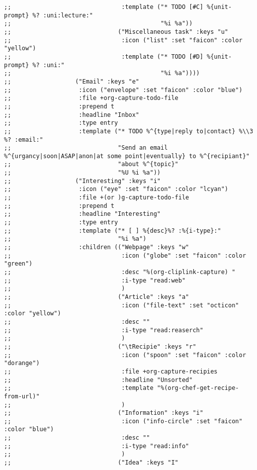 \documentclass[11pt]{article}
\begin{document}
\begin{verbatim}
;;                               :template ("* TODO [#C] %{unit-prompt} %? :uni:lecture:"
;;                                          "%i %a"))
;;                              ("Miscellaneous task" :keys "u"
;;                               :icon ("list" :set "faicon" :color "yellow")
;;                               :template ("* TODO [#D] %{unit-prompt} %? :uni:"
;;                                          "%i %a"))))
;;                  ("Email" :keys "e"
;;                   :icon ("envelope" :set "faicon" :color "blue")
;;                   :file +org-capture-todo-file
;;                   :prepend t
;;                   :headline "Inbox"
;;                   :type entry
;;                   :template ("* TODO %^{type|reply to|contact} %\\3 %? :email:"
;;                              "Send an email %^{urgancy|soon|ASAP|anon|at some point|eventually} to %^{recipiant}"
;;                              "about %^{topic}"
;;                              "%U %i %a"))
;;                  ("Interesting" :keys "i"
;;                   :icon ("eye" :set "faicon" :color "lcyan")
;;                   :file +(or )g-capture-todo-file
;;                   :prepend t
;;                   :headline "Interesting"
;;                   :type entry
;;                   :template ("* [ ] %{desc}%? :%{i-type}:"
;;                              "%i %a")
;;                   :children (("Webpage" :keys "w"
;;                               :icon ("globe" :set "faicon" :color "green")
;;                               :desc "%(org-cliplink-capture) "
;;                               :i-type "read:web"
;;                               )
;;                              ("Article" :keys "a"
;;                               :icon ("file-text" :set "octicon" :color "yellow")
;;                               :desc ""
;;                               :i-type "read:reaserch"
;;                               )
;;                              ("\tRecipie" :keys "r"
;;                               :icon ("spoon" :set "faicon" :color "dorange")
;;                               :file +org-capture-recipies
;;                               :headline "Unsorted"
;;                               :template "%(org-chef-get-recipe-from-url)"
;;                               )
;;                              ("Information" :keys "i"
;;                               :icon ("info-circle" :set "faicon" :color "blue")
;;                               :desc ""
;;                               :i-type "read:info"
;;                               )
;;                              ("Idea" :keys "I"

\end{verbatim}
\end{document}
